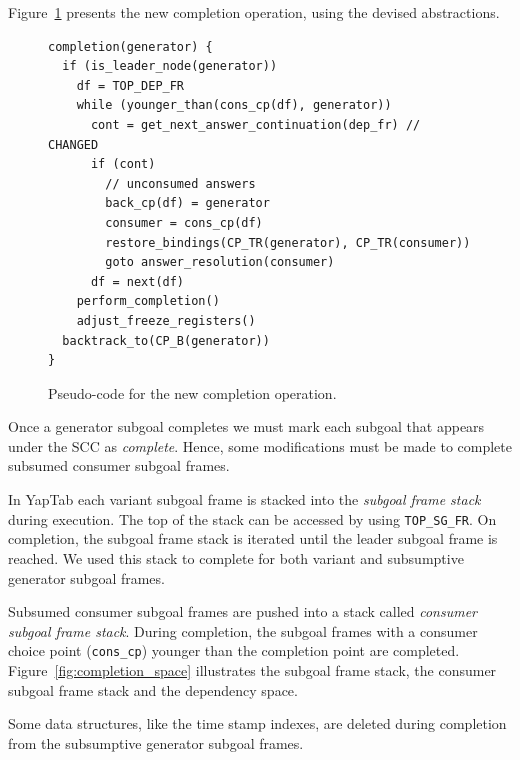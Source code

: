 Figure~\ref{fig:completion_operation} presents the new completion operation,
using the devised abstractions.

\begin{figure}[ht]
\begin{Verbatim}
completion(generator) {
  if (is_leader_node(generator))
    df = TOP_DEP_FR
    while (younger_than(cons_cp(df), generator))
      cont = get_next_answer_continuation(dep_fr) // CHANGED
      if (cont)
        // unconsumed answers
        back_cp(df) = generator
        consumer = cons_cp(df)
        restore_bindings(CP_TR(generator), CP_TR(consumer))
        goto answer_resolution(consumer)
      df = next(df)
    perform_completion()
    adjust_freeze_registers()
  backtrack_to(CP_B(generator))
}
\end{Verbatim}
\caption{Pseudo-code for the new completion operation.}
\label{fig:completion_operation}
\end{figure}

Once a generator subgoal completes we must mark each subgoal that appears under the SCC as \textit{complete}.
Hence, some modifications must be made to complete subsumed consumer subgoal frames.

In YapTab each variant subgoal frame is stacked into the \textit{subgoal frame stack} during execution.
The top of the stack can be accessed by using \texttt{TOP\_SG\_FR}.  On completion, the subgoal frame
stack is iterated until the leader subgoal frame is reached. We used this stack to complete for both
variant and subsumptive generator subgoal frames.

Subsumed consumer subgoal frames are pushed into a stack called \textit{consumer subgoal frame stack}.
During completion, the subgoal frames with a consumer choice point (\texttt{cons\_cp})
younger than the completion point are completed. Figure~\ref{fig:completion_space} illustrates the
subgoal frame stack, the consumer subgoal frame stack and the dependency space.

Some data structures, like the time stamp indexes, are deleted during completion from the
subsumptive generator subgoal frames.

